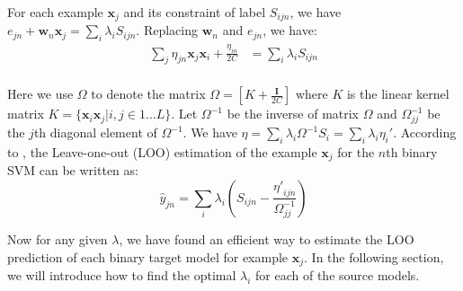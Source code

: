 For each example $\textbf{x}_j$ and its constraint of label $S_{ijn}$, we have $e_{jn}  + \textbf{w}_n\textbf{x}_j= \sum_i\lambda_iS_{ijn}$. Replacing $\textbf{w}_n$ and $e_{jn}$,  we have:
\begin{equation}
\begin{aligned}
\sum_j\eta_{jn}\textbf{x}_j\textbf{x}_i+\frac{\eta_{in}}{2C}&=\sum_i\lambda_iS_{ijn}\\
\end{aligned}
\end{equation}


Here we use $\Omega$ to denote the matrix $\Omega=[K+\frac{\mathbf{I}}{2C}]$ where $K$ is the linear kernel matrix $K=\{\textbf{x}_i\textbf{x}_j|i,j\in 1\dots L\}$. Let
$\Omega^{-1}$ be the inverse of matrix $\Omega$ and $\Omega^{-1}_{jj}$ be the $j$th diagonal element of $\Omega^{-1}$. We have $\eta = \sum_i\lambda_i\Omega^{-1}S_i=\sum_i\lambda_i\eta_i'$. 
According to  \cite{cawley2006leave}, the Leave-one-out (LOO) estimation of the example $\textbf{x}_j$ for the $n$th binary SVM can be written as:
\begin{equation}\label{eq:yhat}
\hat{y}_{jn} = \sum_i\lambda_i\left(S_{ijn}-\frac{{\eta'}_{ijn}}{\Omega_{jj}^{-1}}\right)
\end{equation}

Now for any given $\lambda$, we have found an efficient way to estimate the LOO prediction of each binary target model for example $\textbf{x}_j$. In the following section, we will introduce how to find the optimal $\lambda_i$ for each of the source models. 
